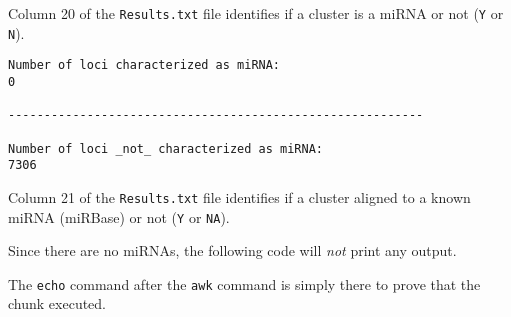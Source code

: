 \documentclass[
]{article}
\newenvironment{Shaded}{\begin{snugshade}}{\end{snugshade}}
\newcommand{\AttributeTok}[1]{\textcolor[rgb]{0.77,0.63,0.00}{#1}}
\newcommand{\BuiltInTok}[1]{#1}
\newcommand{\CommentTok}[1]{\textcolor[rgb]{0.56,0.35,0.01}{\textit{#1}}}
\newcommand{\DataTypeTok}[1]{\textcolor[rgb]{0.13,0.29,0.53}{#1}}
\newcommand{\FunctionTok}[1]{\textcolor[rgb]{0.00,0.00,0.00}{#1}}
\newcommand{\KeywordTok}[1]{\textcolor[rgb]{0.13,0.29,0.53}{\textbf{#1}}}
\newcommand{\NormalTok}[1]{#1}
\newcommand{\StringTok}[1]{\textcolor[rgb]{0.31,0.60,0.02}{#1}}
\newcommand{\VariableTok}[1]{\textcolor[rgb]{0.00,0.00,0.00}{#1}}
\begin{document}
Column 20 of the \texttt{Results.txt} file identifies if a cluster is a miRNA or not (\texttt{Y} or \texttt{N}).

\begin{Shaded}
\end{Shaded}

\begin{verbatim}
Number of loci characterized as miRNA:
0

----------------------------------------------------------

Number of loci _not_ characterized as miRNA:
7306
\end{verbatim}

Column 21 of the \texttt{Results.txt} file identifies if a cluster aligned to a known miRNA (miRBase) or not (\texttt{Y} or \texttt{NA}).

Since there are no miRNAs, the following code will \emph{not} print any output.

The \texttt{echo} command after the \texttt{awk} command is simply there to prove that the chunk executed.
\end{document}
